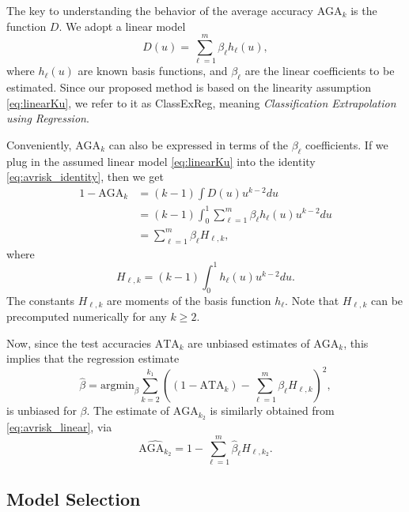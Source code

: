 \documentclass[twoside,11pt]{article}
\newcommand{\argmin}{\text{argmin}}
\begin{document}
The key to understanding the behavior of the average accuracy
$\text{AGA}_k$ is the function ${D}$.  We adopt a linear model
\begin{equation}\label{eq:linearKu}
{D}(u) = \sum_{\ell = 1}^m \beta_\ell h_\ell(u),
\end{equation}
where $h_\ell(u)$ are known basis functions, and $\beta_\ell$ are the
linear coefficients to be estimated.  Since our proposed method is
based on the linearity assumption \eqref{eq:linearKu}, we refer to it as ClassExReg,
meaning \emph{Classification Extrapolation using Regression}.

Conveniently, $\text{AGA}_k$ can also be expressed in terms of the $\beta_\ell$ coefficients.
If we plug in the assumed linear model \eqref{eq:linearKu} into the
identity \eqref{eq:avrisk_identity}, then we get
\begin{align}
1 - \text{AGA}_k &= (k-1)\int {D}(u) u^{k-2} du
\\&= (k-1)\int_0^1 \sum_{\ell = 1}^m \beta_\ell h_\ell(u) u^{k-2} du
\\&= \sum_{\ell = 1}^m \beta_\ell H_{\ell,k}, \label{eq:avrisk_linear}
\end{align}
where
\begin{equation}
H_{\ell,k} = (k-1) \int_0^1 h_\ell(u) u^{k-2} du.
\end{equation}
The constants $H_{\ell, k}$ are moments of the basis function
$h_\ell$.  Note that $H_{\ell, k}$ can be precomputed numerically for any $k \geq 2$.

Now, since the test accuracies $\text{ATA}_k$ are unbiased estimates
of $\text{AGA}_{k}$, this implies that the regression estimate
\[
\hat{\beta} = \argmin_\beta \sum_{k=2}^{k_1} \left( (1 - \text{ATA}_k) - \sum_{\ell=1}^m \beta_\ell H_{\ell, k}\right)^2,
\]
is unbiased for $\beta$. The estimate of $\text{AGA}_{k_2}$ is similarly obtained
from \eqref{eq:avrisk_linear}, via
\begin{equation}\label{eq:avrisk_hat}
\widehat{\text{AGA}_{k_2}} = 1 - \sum_{\ell=1}^m \hat{\beta}_\ell H_{\ell, k_2}.
\end{equation}

\subsection{Model Selection}\label{sec:modelselection}
\end{document}
